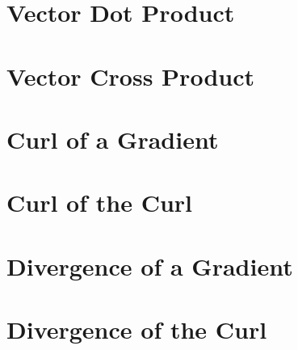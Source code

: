 \section{Vector Dot Product}
\section{Vector Cross Product}
\section{Curl of a Gradient}
\section{Curl of the Curl}
\section{Divergence of a Gradient}
\section{Divergence of the Curl}

